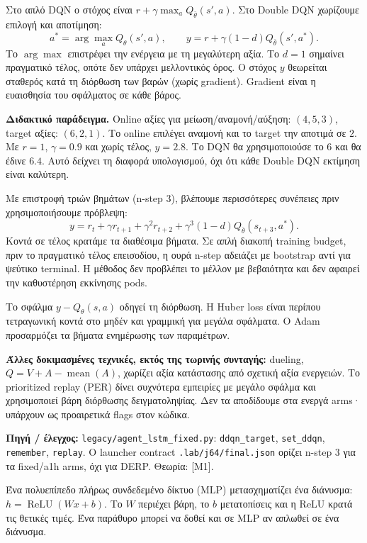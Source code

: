 \documentclass[11pt,a4paper]{article}
\newcommand{\page}[2]{\clearpage\pdfbookmark[0]{#1}{topic\thepage}{\sffamily\color{ink}\LARGE #1\par}\vspace{3pt}{\sffamily\large #2\par}\vspace{8pt}}
\newcommand{\src}[1]{\vfill{\footnotesize\color{ink}\textbf{Πηγή / έλεγχος:} #1\par}}
\newcommand{\code}[1]{{\footnotesize\nolinkurl{#1}}}
\begin{document}
Στο απλό DQN ο στόχος είναι $r+\gamma\max_a Q_{\bar\theta}(s',a)$. Στο Double DQN χωρίζουμε επιλογή και αποτίμηση:
\[
 a^*=\arg\max_a Q_\theta(s',a),\qquad
 y=r+\gamma(1-d)Q_{\bar\theta}(s',a^*).
\]
Το $\arg\max$ επιστρέφει την ενέργεια με τη μεγαλύτερη αξία. Το $d=1$ σημαίνει πραγματικό τέλος, οπότε δεν υπάρχει μελλοντικός όρος. Ο στόχος $y$ θεωρείται σταθερός κατά τη διόρθωση των βαρών (χωρίς gradient). Gradient είναι η ευαισθησία του σφάλματος σε κάθε βάρος.

\textbf{Διδακτικό παράδειγμα.} Online αξίες για μείωση/αναμονή/αύξηση: $(4,5,3)$, target αξίες: $(6,2,1)$. Το online επιλέγει αναμονή και το target την αποτιμά σε $2$. Με $r=1$, $\gamma=0.9$ και χωρίς τέλος, $y=2.8$. Το DQN θα χρησιμοποιούσε το $6$ και θα έδινε $6.4$. Αυτό δείχνει τη διαφορά υπολογισμού, όχι ότι κάθε Double DQN εκτίμηση είναι καλύτερη.

Με επιστροφή τριών βημάτων (n-step 3), βλέπουμε περισσότερες συνέπειες πριν χρησιμοποιήσουμε πρόβλεψη:
\[
 y=r_t+\gamma r_{t+1}+\gamma^2r_{t+2}
   +\gamma^3(1-d)Q_{\bar\theta}(s_{t+3},a^*).
\]
Κοντά σε τέλος κρατάμε τα διαθέσιμα βήματα. Σε απλή διακοπή training budget, πριν το πραγματικό τέλος επεισοδίου, η ουρά n-step αδειάζει με bootstrap αντί για ψεύτικο terminal. Η μέθοδος δεν προβλέπει το μέλλον με βεβαιότητα και δεν αφαιρεί την καθυστέρηση εκκίνησης pods.

Το σφάλμα $y-Q_\theta(s,a)$ οδηγεί τη διόρθωση. Η Huber loss είναι περίπου τετραγωνική κοντά στο μηδέν και γραμμική για μεγάλα σφάλματα. Ο Adam προσαρμόζει τα βήματα ενημέρωσης των παραμέτρων.

\textbf{Άλλες δοκιμασμένες τεχνικές, εκτός της τωρινής συνταγής:} dueling, $Q=V+A-\operatorname{mean}(A)$, χωρίζει αξία κατάστασης από σχετική αξία ενεργειών. Το prioritized replay (PER) δίνει συχνότερα εμπειρίες με μεγάλο σφάλμα και χρησιμοποιεί βάρη διόρθωσης δειγματοληψίας. Δεν τα αποδίδουμε στα ενεργά arms· υπάρχουν ως προαιρετικά flags στον κώδικα.
\src{\code{legacy/agent_lstm_fixed.py}: \code{ddqn_target}, \code{set_ddqn}, \code{remember}, \code{replay}. Ο launcher contract \code{.lab/j64/final.json} ορίζει n-step 3 για τα fixed/a1h arms, όχι για DERP. Θεωρία: [Μ1].}

\page{7 · LSTM: χρήσιμη μνήμη}{Πώς ξεχωρίζουμε άνοδο από υποχώρηση φορτίου;}
Ένα πολυεπίπεδο πλήρως συνδεδεμένο δίκτυο (MLP) μετασχηματίζει ένα διάνυσμα: $h=\operatorname{ReLU}(Wx+b)$. Το $W$ περιέχει βάρη, το $b$ μετατοπίσεις και η ReLU κρατά τις θετικές τιμές. Ένα παράθυρο μπορεί να δοθεί και σε MLP αν απλωθεί σε ένα διάνυσμα.
\end{document}
